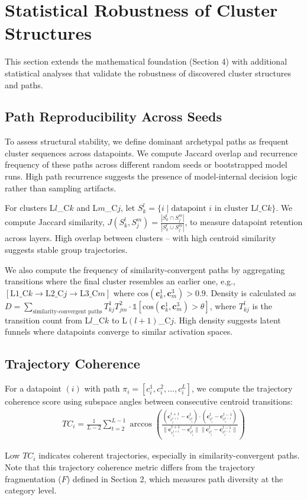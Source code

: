 \section{Statistical Robustness of Cluster Structures}

This section extends the mathematical foundation (Section 4) with additional statistical analyses that validate the robustness of discovered cluster structures and paths.

\subsection{Path Reproducibility Across Seeds}

To assess structural stability, we define dominant archetypal paths as frequent cluster sequences across datapoints. We compute Jaccard overlap and recurrence frequency of these paths across different random seeds or bootstrapped model runs. High path recurrence suggests the presence of model-internal decision logic rather than sampling artifacts. 

For clusters L$l$\_C$k$ and L$m$\_C$j$, let $S_k^l = \{i \mid \text{datapoint } i \text{ in cluster L}l\text{\_C}k\}$. We compute Jaccard similarity, $J(S_k^l, S_j^m) = \frac{|S_k^l \cap S_j^m|}{|S_k^l \cup S_j^m|}$, to measure datapoint retention across layers. High overlap between clusters -- with high centroid similarity suggests stable group trajectories. 

We also compute the frequency of similarity-convergent paths by aggregating transitions where the final cluster resembles an earlier one, e.g., $[\text{L1\_C}k \rightarrow \text{L2\_C}j \rightarrow \text{L3\_C}m]$ where $\text{cos}(\mathbf{c}_k^1, \mathbf{c}_m^3) > 0.9$. Density is calculated as $D = \sum_{\text{similarity-convergent paths}} T^1_{kj} T^2_{jm} \cdot \mathbb{1}[\text{cos}(\mathbf{c}_k^1, \mathbf{c}_m^3) > \theta]$, where $T^l_{kj}$ is the transition count from L$l$\_C$k$ to L$(l+1)$\_C$j$. High density suggests latent funnels where datapoints converge to similar activation spaces.

\subsection{Trajectory Coherence}

For a datapoint $(i)$ with path $\pi_i = [c_i^1, c_i^2, \dots, c_i^L]$, we compute the trajectory coherence score using subspace angles between consecutive centroid transitions: 
\begin{align}
TC_i = \frac{1}{L-2} \sum_{t=2}^{L-1} \arccos\left(\frac{(\mathbf{c}_{c_i^{t+1}}^{t+1} - \mathbf{c}_{c_i^t}^t) \cdot (\mathbf{c}_{c_i^t}^t - \mathbf{c}_{c_i^{t-1}}^{t-1})}{\|\mathbf{c}_{c_i^{t+1}}^{t+1} - \mathbf{c}_{c_i^t}^t\| \|\mathbf{c}_{c_i^t}^t - \mathbf{c}_{c_i^{t-1}}^{t-1}\|}\right)
\end{align}

Low $TC_i$ indicates coherent trajectories, especially in similarity-convergent paths. Note that this trajectory coherence metric differs from the trajectory fragmentation ($F$) defined in Section 2, which measures path diversity at the category level.

